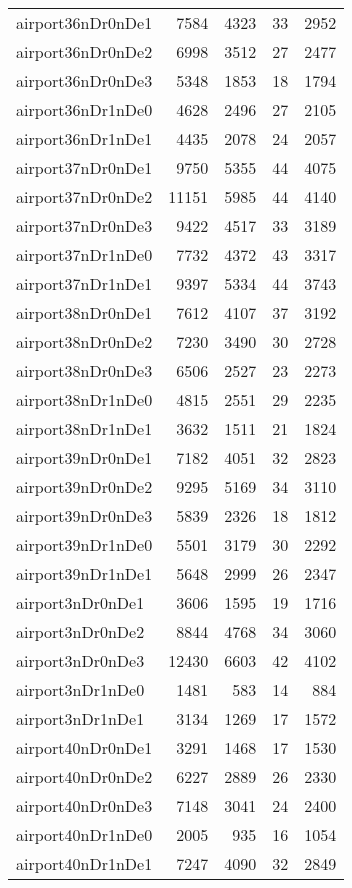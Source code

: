 \begin{longtable}{lrrrr}
airport36nDr0nDe1 & 7584 & 4323 & 33 & 2952 \\
airport36nDr0nDe2 & 6998 & 3512 & 27 & 2477 \\
airport36nDr0nDe3 & 5348 & 1853 & 18 & 1794 \\
airport36nDr1nDe0 & 4628 & 2496 & 27 & 2105 \\
airport36nDr1nDe1 & 4435 & 2078 & 24 & 2057 \\
airport37nDr0nDe1 & 9750 & 5355 & 44 & 4075 \\
airport37nDr0nDe2 & 11151 & 5985 & 44 & 4140 \\
airport37nDr0nDe3 & 9422 & 4517 & 33 & 3189 \\
airport37nDr1nDe0 & 7732 & 4372 & 43 & 3317 \\
airport37nDr1nDe1 & 9397 & 5334 & 44 & 3743 \\
airport38nDr0nDe1 & 7612 & 4107 & 37 & 3192 \\
airport38nDr0nDe2 & 7230 & 3490 & 30 & 2728 \\
airport38nDr0nDe3 & 6506 & 2527 & 23 & 2273 \\
airport38nDr1nDe0 & 4815 & 2551 & 29 & 2235 \\
airport38nDr1nDe1 & 3632 & 1511 & 21 & 1824 \\
airport39nDr0nDe1 & 7182 & 4051 & 32 & 2823 \\
airport39nDr0nDe2 & 9295 & 5169 & 34 & 3110 \\
airport39nDr0nDe3 & 5839 & 2326 & 18 & 1812 \\
airport39nDr1nDe0 & 5501 & 3179 & 30 & 2292 \\
airport39nDr1nDe1 & 5648 & 2999 & 26 & 2347 \\
airport3nDr0nDe1 & 3606 & 1595 & 19 & 1716 \\
airport3nDr0nDe2 & 8844 & 4768 & 34 & 3060 \\
airport3nDr0nDe3 & 12430 & 6603 & 42 & 4102 \\
airport3nDr1nDe0 & 1481 & 583 & 14 & 884 \\
airport3nDr1nDe1 & 3134 & 1269 & 17 & 1572 \\
airport40nDr0nDe1 & 3291 & 1468 & 17 & 1530 \\
airport40nDr0nDe2 & 6227 & 2889 & 26 & 2330 \\
airport40nDr0nDe3 & 7148 & 3041 & 24 & 2400 \\
airport40nDr1nDe0 & 2005 & 935 & 16 & 1054 \\
airport40nDr1nDe1 & 7247 & 4090 & 32 & 2849 \\

\end{longtable}
